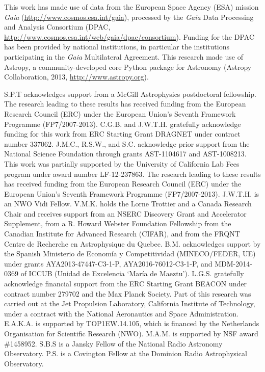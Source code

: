 \documentclass[twocolumn]{aastex61}
\begin{document}
This work has made use of data from the European Space Agency (ESA) mission {\it Gaia} (\url{http://www.cosmos.esa.int/gaia}), processed by the {\it Gaia} Data Processing and Analysis Consortium (DPAC, \url{http://www.cosmos.esa.int/web/gaia/dpac/consortium}). Funding for the DPAC has been provided by national institutions, in particular the institutions participating in the {\it Gaia} Multilateral Agreement. This research made use of Astropy, a community-developed core Python package for Astronomy (Astropy Collaboration, 2013, \url{http://www.astropy.org}).

S.P.T acknowledges support from a McGill Astrophysics postdoctoral fellowship. The research leading to these results has received funding from the European Research Council (ERC) under the European Union's Seventh Framework Programme (FP7/2007-2013). C.G.B. and J.W.T.H. gratefully acknowledge funding for this work from ERC Starting Grant DRAGNET under contract number 337062. J.M.C., R.S.W., and S.C. acknowledge prior support from the National Science Foundation through grants AST-1104617 and AST-1008213. This work was partially supported by the University of California Lab Fees program under award number LF-12-237863. The research leading to these results has received funding from the European Research Council (ERC) under the European Union’s Seventh Framework Programme (FP7/2007-2013).  J.W.T.H. is an NWO Vidi Fellow. V.M.K. holds the Lorne Trottier and a Canada Research Chair and receives support from an NSERC Discovery Grant and Accelerator Supplement, from a R. Howard Webster Foundation Fellowship from the Canadian Institute for Advanced Research (CIFAR), and from the FRQNT Centre de Recherche en Astrophysique du Quebec. B.M. acknowledges support by the Spanish Ministerio de Econom\'ia y Competitividad (MINECO/FEDER, UE) under grants AYA2013-47447-C3-1-P, AYA2016-76012-C3-1-P, and MDM-2014-0369 of ICCUB (Unidad de Excelencia `Mar\'ia de Maeztu'). L.G.S. gratefully acknowledge financial support from the ERC Starting Grant BEACON under contract number 279702 and the Max Planck Society. Part of this research was carried out at the Jet Propulsion Laboratory, California Institute of Technology, under a contract with the National Aeronautics and Space Administration. E.A.K.A. is supported by TOP1EW.14.105, which is financed by the Netherlands Organisation for Scientific Research (NWO). M.A.M. is supported by NSF award \#1458952. S.B.S is a Jansky Fellow of the National Radio Astronomy Observatory. P.S. is a Covington Fellow at the Dominion Radio Astrophysical Observatory.
\end{document}
